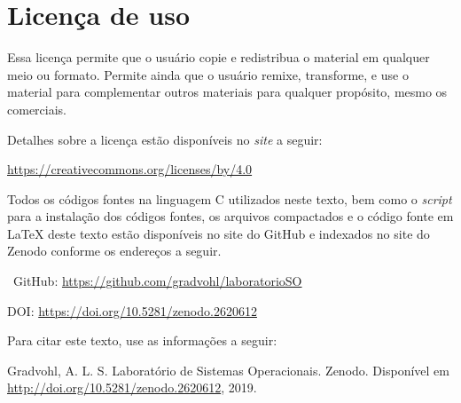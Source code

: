\chapter*{Licença de uso}\label{chp:licenca}
\doclicenseThis

Essa licença permite que o usuário copie e redistribua o material em qualquer meio ou formato. Permite ainda que o usuário remixe, transforme, e use o material para complementar outros materiais para qualquer propósito, mesmo os comerciais.

 Detalhes sobre a licença estão disponíveis no \textit{site} a seguir:
 \begin{center}
    \url{https://creativecommons.org/licenses/by/4.0}     
 \end{center}

Todos os códigos fontes na linguagem C utilizados neste texto, bem como o \textit{script} para a instalação dos códigos fontes, os arquivos compactados e o código fonte em \LaTeX{} deste texto estão disponíveis no site do GitHub e indexados no site do Zenodo conforme os endereços a seguir.

\faGithub\ GitHub: \url{https://github.com/gradvohl/laboratorioSO}

DOI: \url{https://doi.org/10.5281/zenodo.2620612}

Para citar este texto, use as informações a seguir:

\noindent
{\sc Gradvohl, A. L. S.} Laboratório de Sistemas Operacionais. Zenodo. Disponível em \url{http://doi.org/10.5281/zenodo.2620612}, 2019.
